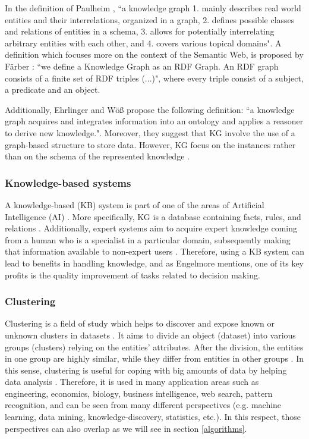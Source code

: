 \documentclass[runningheads]{llncs}
\begin{document}
In the definition of Paulheim \cite{Paulheim}, ``a knowledge graph
1. mainly describes real world entities and their interrelations, organized in a graph, 2. defines possible classes and relations of entities in a schema, 3. allows for potentially interrelating arbitrary entities with each other, and 4. covers various topical domains". A definition which focuses more on the context of the Semantic Web, is proposed by F{\"a}rber \cite{Farber}: ``we define a Knowledge Graph as an RDF Graph. An RDF graph consists of a finite set of RDF triples (...)", where every triple consist of a subject, a predicate and an object.

Additionally, Ehrlinger and W{\"o}{\ss} \cite{Ehrlinger} propose the following definition: ``a knowledge graph acquires and integrates information into an ontology and applies a reasoner to derive new knowledge.". Moreover, they suggest that KG involve the use of a graph-based structure to store data. However, KG focus on the instances rather than on the schema of the represented knowledge \cite{Paulheim}.


\subsubsection{Knowledge-based systems} \label{knowledge-based}
A knowledge-based (KB) system is part of one of the areas of Artificial Intelligence (AI) \cite{Tripathi}. More specifically, KG is a database containing facts, rules, and relations \cite{Engelmore}. Additionally, expert systems aim to acquire expert knowledge coming from a human who is a specialist in a particular domain, subsequently making that information available to non-expert users \cite{Tripathi}.
Therefore, using a KB system can lead to benefits in handling knowledge, and as Engelmore \cite{Engelmore} mentions, one of its key profits is the quality improvement of tasks related to decision making.


\subsubsection{Clustering} \label{clustering}
Clustering is a field of study which helps to discover and expose known or unknown clusters in datasets \cite{Han} \cite{Mirkin}. It aims to divide an object (dataset) into various groups (clusters) relying on the entities' attributes. After the division, the entities in one group are highly similar, while they differ from entities in other groups \cite{Han}. In this sense, clustering is useful for coping with big amounts of data by helping data analysis \cite{Pedrycz} \cite{Mirkin}. Therefore, it is used in many application areas such as engineering, economics, biology, business intelligence, web search, pattern recognition, \cite{Pedrycz} \cite{Han} and can be seen from many different perspectives (e.g. machine learning, data mining, knowledge-discovery, statistics, etc.). In this respect, those perspectives can also overlap as we will see in section \ref{algorithms}.
\end{document}
